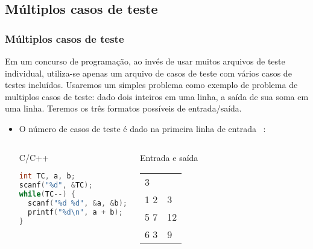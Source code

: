 
\subsection{Múltiplos casos de teste}

\begin{frame} [fragile]
  \frametitle{Múltiplos casos de teste}
  {\small Em um concurso de programação, ao invés de usar muitos arquivos de teste individual, utiliza-se apenas um arquivo de casos de teste com vários casos de testes incluídos. Usaremos um simples problema como exemplo de problema de multiplos casos de teste: dado dois inteiros em uma linha, a saída de sua soma em uma linha. Teremos os três formatos possíveis de entrada/saída.}
    \begin{itemize}
      \item {\small O número de casos de teste é dado na primeira linha de entrada ~\cite{halim2013competitive}:}
      \begin{columns}
      \begin{block:ie}{C/C++}
	\begin{lstlisting}[language=c]
int TC, a, b;
scanf("%d", &TC);
while(TC--) {
  scanf("%d %d", &a, &b);
  printf("%d\n", a + b);
}
	\end{lstlisting}
      \end{block:ie}

      \begin{block:ie}{Entrada e saída}
	\begin{tabularx}{\textwidth}{|X|X|}
	  3&\\1 2&3\\5 7&12\\6 3 &9
	\end{tabularx}
      \end{block:ie}
    \end{columns}
  \end{itemize}
\end{frame}

